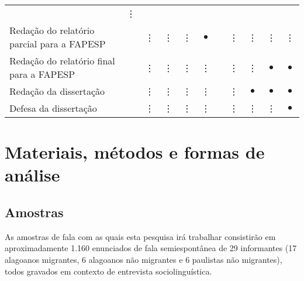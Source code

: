 \documentclass[
		a4paper,	%
		12pt,		%
		]{article}	%
\begin{document}
\begin{quadro}[h!]
\begin{tabular}{m{.44\linewidth}cccccccccc}
			&\vdots \\  
			\rowcolor{cinza1}
			Redação do relatório parcial para a FAPESP &&\vdots&\vdots&\vdots&$\bullet$&&\vdots&\vdots&\vdots &\vdots \\  
			Redação do relatório final para a FAPESP &&\vdots&\vdots&\vdots&\vdots&&\vdots&\vdots&$\bullet$ & $\bullet$\\  
			\rowcolor{cinza1}
			Redação da dissertação &&\vdots&\vdots&\vdots&\vdots&&\vdots&$\bullet$&$\bullet$ &$\bullet$ \\  
			Defesa da dissertação &&\vdots&\vdots&\vdots&\vdots&&\vdots&\vdots&\vdots&$\bullet$ \\  
			\hline
			\hline
		\end{tabular}
	\end{quadro}
		
	\section{Materiais, métodos e formas de análise} \label{metodo}

\begin{comment}
	A metodologia adotada nesta pesquisa terá como objetivo central determinar
	como se dá a distribuição de um conjunto de métricas rítmicas, extraídas de
	gravações da fala de uma amostra de migrantes alagoanos moradores de São
	Paulo, em função de duas variáveis sociais: a idade de migração e o tempo de
	residência na comunidade anfitriã.
\end{comment}

	\subsection{Amostras} \label{amostra}

	As amostras de fala com as quais esta pesquisa irá trabalhar consistirão em
	aproximadamente 1.160 enunciados de fala semiespontânea de 29 informantes
	(17 alagoanos migrantes, 6 alagoanos não migrantes e 6 paulistas não
	migrantes), todos gravados em contexto de entrevista sociolinguística.
\end{document}
